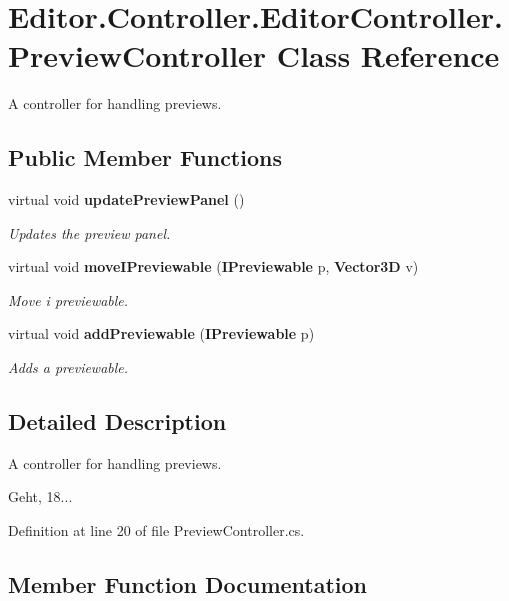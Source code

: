 \section{Editor.\-Controller.\-Editor\-Controller.\-Preview\-Controller Class Reference}
\label{class_editor_1_1_controller_1_1_editor_controller_1_1_preview_controller}


A controller for handling previews.  


\subsection*{Public Member Functions}
\begin{DoxyCompactItemize}
\item 
virtual void {\bf update\-Preview\-Panel} ()
\begin{DoxyCompactList}\small\item\em Updates the preview panel. \end{DoxyCompactList}\item 
virtual void {\bf move\-I\-Previewable} ({\bf I\-Previewable} p, {\bf Vector3\-D} v)
\begin{DoxyCompactList}\small\item\em Move i previewable. \end{DoxyCompactList}\item 
virtual void {\bf add\-Previewable} ({\bf I\-Previewable} p)
\begin{DoxyCompactList}\small\item\em Adds a previewable. \end{DoxyCompactList}\end{DoxyCompactItemize}


\subsection{Detailed Description}
A controller for handling previews. 

Geht, 18... 

Definition at line 20 of file Preview\-Controller.\-cs.



\subsection{Member Function Documentation}
